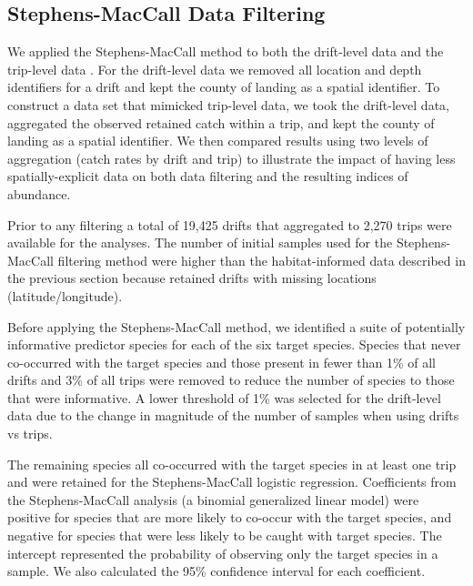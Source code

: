 \documentclass[
  12pt,
  authoryear,
  preprint,
  3p]{elsarticle}
\begin{document}
\hypertarget{stephens-maccall-data-filtering}{%
\subsection{Stephens-MacCall Data
Filtering}\label{stephens-maccall-data-filtering}}

We applied the Stephens-MacCall method to both the drift-level data and
the trip-level data \citeyearpar{Stephens:2004:MAS}. For the drift-level
data we removed all location and depth identifiers for a drift and kept
the county of landing as a spatial identifier. To construct a data set
that mimicked trip-level data, we took the drift-level data, aggregated
the observed retained catch within a trip, and kept the county of
landing as a spatial identifier. We then compared results using two
levels of aggregation (catch rates by drift and trip) to illustrate the
impact of having less spatially-explicit data on both data filtering and
the resulting indices of abundance.

Prior to any filtering a total of 19,425 drifts that aggregated to 2,270
trips were available for the analyses. The number of initial samples
used for the Stephens-MacCall filtering method were higher than the
habitat-informed data described in the previous section because retained
drifts with missing locations (latitude/longitude).

Before applying the Stephens-MacCall method, we identified a suite of
potentially informative predictor species for each of the six target
species. Species that never co-occurred with the target species and
those present in fewer than 1\% of all drifts and 3\% of all trips were
removed to reduce the number of species to those that were informative.
A lower threshold of 1\% was selected for the drift-level data due to
the change in magnitude of the number of samples when using drifts vs
trips.

The remaining species all co-occurred with the target species in at
least one trip and were retained for the Stephens-MacCall logistic
regression. Coefficients from the Stephens-MacCall analysis (a binomial
generalized linear model) were positive for species that are more likely
to co-occur with the target species, and negative for species that were
less likely to be caught with target species. The intercept represented
the probability of observing only the target species in a sample. We
also calculated the 95\% confidence interval for each coefficient.
\end{document}
